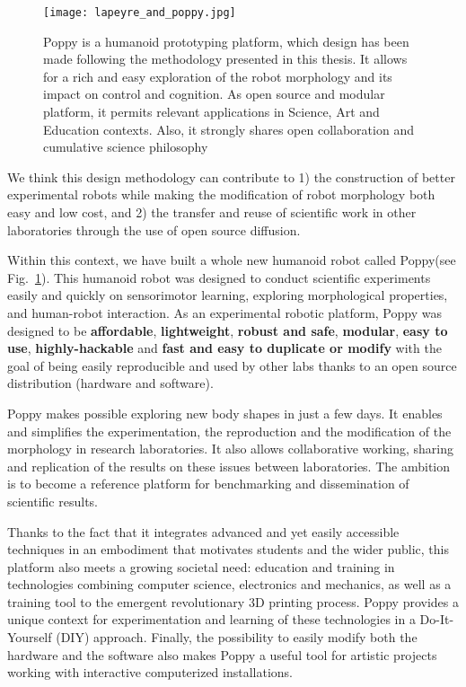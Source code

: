 \begin{figure}[tb]
    \begin{center}
        \texttt{[image: lapeyre\_and\_poppy.jpg]}
    \end{center}
    \caption{Poppy is a humanoid prototyping platform, which design has been made following the methodology presented in this thesis. It allows for a rich and easy exploration of the robot morphology and its impact on control and cognition. As open source and modular platform, it permits relevant applications in Science, Art and Education contexts. Also, it strongly shares open collaboration and cumulative science philosophy}
    \label{fig:poppy_with_me}
\end{figure}

We think this design methodology can contribute to  1) the construction of better experimental robots while making the modification of robot morphology both easy and low cost, and 2) the transfer and reuse of scientific work in other laboratories through the use of open source diffusion.

Within this context, we have built a whole new humanoid robot called Poppy\texttrademark (see Fig.~\ref{fig:poppy_with_me}). This humanoid robot was designed to conduct scientific experiments easily and quickly on sensorimotor learning, exploring morphological properties, and human-robot interaction. As an experimental robotic platform, Poppy was designed to be \textbf{affordable}, \textbf{lightweight}, \textbf{robust and safe}, \textbf{modular}, \textbf{easy to use}, \textbf{highly-hackable} and \textbf{fast and easy to duplicate or modify} with the goal of being easily reproducible and used by other labs thanks to an open source distribution (hardware and software).



Poppy makes possible exploring new body shapes in just a few days. It enables and simplifies the experimentation, the reproduction and the modification of the morphology in research laboratories. It also allows collaborative working, sharing and replication of the results on these issues between laboratories. The ambition is to become a reference platform for benchmarking and dissemination of scientific results.

Thanks to the fact that it integrates advanced and yet easily accessible techniques in an embodiment that motivates students and the wider public, this platform also meets a growing societal need: education and training in technologies combining computer science, electronics and mechanics, as well as a training tool to the emergent revolutionary 3D printing process. Poppy provides a unique context for experimentation and learning of these technologies in a Do-It-Yourself (DIY) approach. Finally, the possibility to easily modify both the hardware and the software also makes Poppy a useful tool for artistic projects working with interactive computerized installations.


